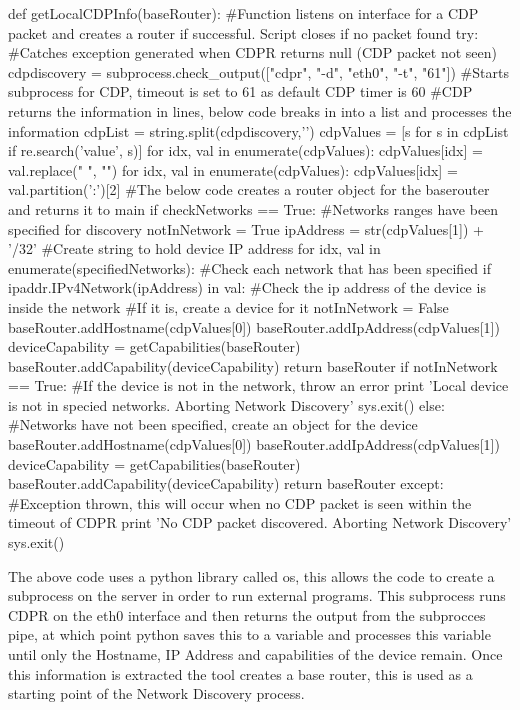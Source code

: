 \documentclass[11pt]{report}
\begin{document}
\begin{python}
def getLocalCDPInfo(baseRouter):
	#Function listens on interface for a CDP packet and creates a router if successful. Script closes if no packet found
	try: #Catches exception generated when CDPR returns null (CDP packet not seen)
		cdpdiscovery = subprocess.check_output(["cdpr", "-d", "eth0", "-t", "61"])
		#Starts subprocess for CDP, timeout is set to 61 as default CDP timer is 60
		#CDP returns the information in lines, below code breaks in into a list and processes the information 
		cdpList = string.split(cdpdiscovery,'\n')
		cdpValues = [s for s in cdpList if re.search('value', s)]
		for idx, val in enumerate(cdpValues):
			cdpValues[idx] = val.replace(" ", "")
		for idx, val in enumerate(cdpValues):
			cdpValues[idx] = val.partition(':')[2]
		#The below code creates a router object for the baserouter and returns it to main
		if checkNetworks == True:
			#Networks ranges have been specified for discovery
			notInNetwork = True
			ipAddress = str(cdpValues[1]) + '/32'
			#Create string to hold device IP address
			for idx, val in enumerate(specifiedNetworks):
				#Check each network that has been specified
				if ipaddr.IPv4Network(ipAddress) in val:
					#Check the ip address of the device is inside the network
					#If it is, create a device for it
					notInNetwork = False
					baseRouter.addHostname(cdpValues[0])
					baseRouter.addIpAddress(cdpValues[1])
					deviceCapability = getCapabilities(baseRouter)
					baseRouter.addCapability(deviceCapability)
					return baseRouter
			if notInNetwork == True:
				#If the device is not in the network, throw an error
				print 'Local device is not in specied networks. Aborting Network Discovery'
				sys.exit()
		else:
		#Networks have not been specified, create an object for the device
		baseRouter.addHostname(cdpValues[0])
		baseRouter.addIpAddress(cdpValues[1])
		deviceCapability = getCapabilities(baseRouter)
		baseRouter.addCapability(deviceCapability)
		return baseRouter
	except:
		#Exception thrown, this will occur when no CDP packet is seen within the timeout of CDPR
		print 'No CDP packet discovered. Aborting Network Discovery'
		sys.exit()
\end{python}

The above code uses a python library called os, this allows the code to create a subprocess on the server in order to run external programs. This subprocess runs CDPR on the eth0 interface and then returns the output from the subprocces pipe, at which point python saves this to a variable and processes this variable until only the Hostname, IP Address and capabilities of the device remain. Once this information is extracted the tool creates a base router, this is used as a starting point of the Network Discovery process.
\end{document}
